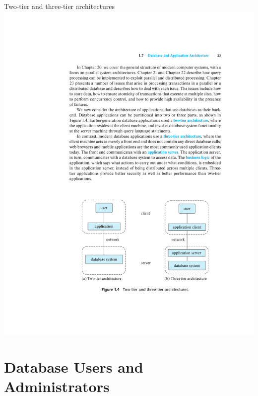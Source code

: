 \documentclass{beamer}
\begin{document}
\begin{frame}{Two-tier and three-tier architectures}
    \centering 
    \includegraphics[width=\textheight, trim={6cm 4.25cm 3.8cm 16.25cm}, clip]{figures/tiers}
\end{frame}

\section{Database Users and Administrators}
\end{document}
